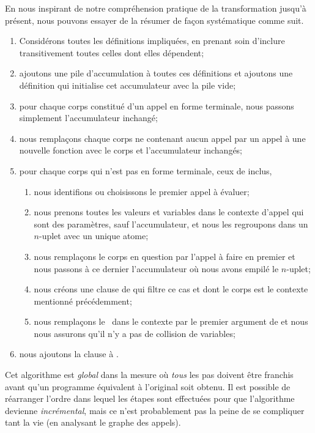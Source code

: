 En nous inspirant de notre compréhension pratique de la transformation
jusqu'à présent, nous pouvons essayer de la résumer de façon
systématique comme suit.
\begin{enumerate}

  \item Considérons toutes les définitions impliquées, en prenant soin
    d'inclure transitivement toutes celles dont elles dépendent;

  \item ajoutons une pile d'accumulation à toutes ces définitions et
    ajoutons une définition qui initialise cet accumulateur avec la
    pile vide;

  \item pour chaque corps constitué d'un appel en forme terminale,
    nous passons simplement l'accumulateur inchangé;

  \item nous remplaçons chaque corps ne contenant aucun appel par un
    appel à une nouvelle fonction  avec le corps et
    l'accumulateur inchangés;

  \item pour chaque corps qui n'est pas en forme terminale, ceux de
     inclus,
    \begin{enumerate}

      \item nous identifions ou choisissons le premier appel à évaluer;

      \item nous prenons toutes les valeurs et variables dans le
        contexte d'appel qui sont des paramètres, sauf l'accumulateur,
        et nous les regroupons dans un \(n\)-uplet avec un unique atome;

      \item nous remplaçons le corps en question par l'appel à faire
        en premier et nous passons à ce dernier l'accumulateur où nous
        avons empilé le \(n\)-uplet;

      \item \label{add_appk1} nous créons une clause de
         qui filtre ce cas et dont le corps est le
        contexte mentionné précédemment;

      \item \label{add_appk2} nous remplaçons
        le~\erlcode{\textvisiblespace} dans le contexte par le premier
        argument de  et nous nous assurons qu'il n'y
        a pas de collision de variables;

    \end{enumerate}

  \item nous ajoutons la clause  à .

\end{enumerate}
Cet algorithme est \emph{global} dans la mesure où \emph{tous} les pas
doivent être franchis avant qu'un programme équivalent à l'original
soit obtenu. Il est possible de réarranger l'ordre dans lequel les
étapes sont effectuées pour que l'algorithme devienne
\emph{incrémental}, mais ce n'est probablement pas la peine de se
compliquer tant la vie (en analysant le graphe des appels).

